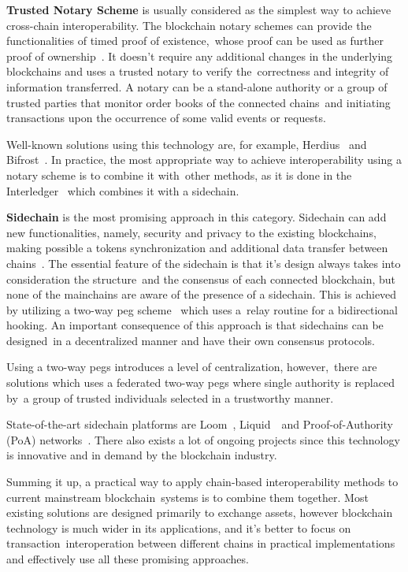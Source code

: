 \textbf{Trusted Notary Scheme} is usually considered as the simplest way to achieve cross-chain interoperability.
The blockchain notary schemes can provide the functionalities of timed proof of existence,\
whose proof can be used as further proof of ownership~\cite{DIFRANCESCOMAESA202099}.
It doesn't require any additional changes in the underlying blockchains and uses a trusted notary to verify the\
correctness and integrity of information transferred.
A notary can be a stand-alone authority or a group of trusted parties that monitor order books of the connected chains\
and initiating transactions upon the occurrence of some valid events or requests.

Well-known solutions using this technology are, for example, Herdius~\cite{Balazs2017} and Bifrost~\cite{Scheid2019}.
In practice, the most appropriate way to achieve interoperability using a notary scheme is to combine it with\
other methods, as it is done in the Interledger~\cite{Thomas2015} which combines it with a sidechain.

\textbf{Sidechain} is the most promising approach in this category.
Sidechain can add new functionalities, namely, security and privacy to the existing blockchains,
making possible a tokens synchronization and additional data transfer between chains~\cite{Parizi2019}.
The essential feature of the sidechain is that it's design always takes into consideration the structure\
and the consensus of each connected blockchain, but none of the mainchains are aware of the presence of a sidechain.
This is achieved by utilizing a two-way peg scheme~\cite{SINGH2020102471} which uses a\
relay routine for a bidirectional hooking.
An important consequence of this approach is that sidechains can be designed\
in a decentralized manner and have their own consensus protocols.

Using a two-way pegs introduces a level of centralization, however,\
there are solutions which uses a federated two-way pegs where single authority is replaced by\
a group of trusted individuals selected in a trustworthy manner.

State-of-the-art sidechain platforms are Loom~\cite{Loom2019}, Liquid~\cite{Nick2020LiquidAB}\
and Proof-of-Authority (PoA) networks~\cite{POA2018}.
There also exists a lot of ongoing projects since this technology is innovative and in demand by the blockchain industry.

Summing it up, a practical way to apply chain-based interoperability methods to current mainstream blockchain\
systems is to combine them together.
Most existing solutions are designed primarily to exchange assets, however blockchain technology is much wider in its applications, and it's better to focus on transaction\
interoperation between different chains in practical implementations and effectively use all these promising approaches.

